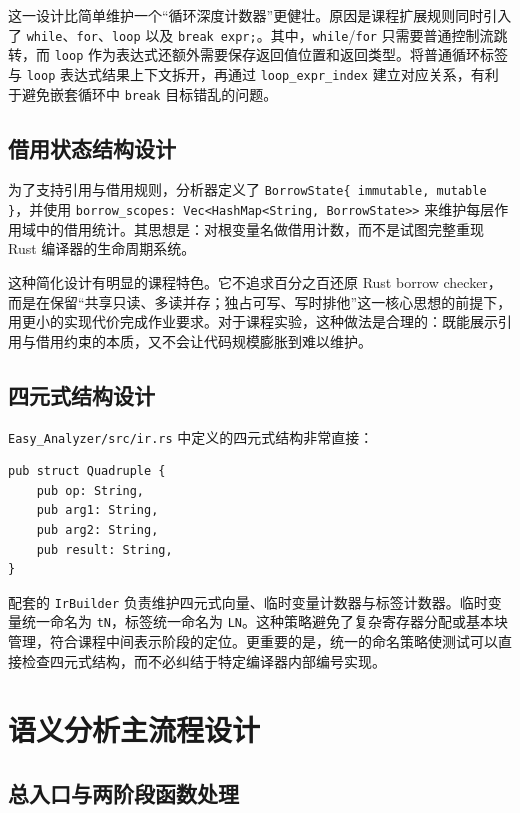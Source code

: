\documentclass[UTF8,a4paper,12pt]{ctexart}
\newcommand{\pkg}[1]{\texttt{#1}}
\begin{document}
这一设计比简单维护一个“循环深度计数器”更健壮。原因是课程扩展规则同时引入了 \pkg{while}、\pkg{for}、\pkg{loop} 以及 \pkg{break expr;}。其中，\pkg{while}/\pkg{for} 只需要普通控制流跳转，而 \pkg{loop} 作为表达式还额外需要保存返回值位置和返回类型。将普通循环标签与 \pkg{loop} 表达式结果上下文拆开，再通过 \pkg{loop\_expr\_index} 建立对应关系，有利于避免嵌套循环中 \pkg{break} 目标错乱的问题。

\subsection{借用状态结构设计}

为了支持引用与借用规则，分析器定义了 \pkg{BorrowState\{ immutable, mutable \}}，并使用 \pkg{borrow\_scopes: Vec<HashMap<String, BorrowState>>} 来维护每层作用域中的借用统计。其思想是：对根变量名做借用计数，而不是试图完整重现 Rust 编译器的生命周期系统。

这种简化设计有明显的课程特色。它不追求百分之百还原 Rust borrow checker，而是在保留“共享只读、多读并存；独占可写、写时排他”这一核心思想的前提下，用更小的实现代价完成作业要求。对于课程实验，这种做法是合理的：既能展示引用与借用约束的本质，又不会让代码规模膨胀到难以维护。

\subsection{四元式结构设计}

\pkg{Easy\_Analyzer/src/ir.rs} 中定义的四元式结构非常直接：

\begin{lstlisting}[style=textStyle,caption={四元式结构}]
pub struct Quadruple {
    pub op: String,
    pub arg1: String,
    pub arg2: String,
    pub result: String,
}
\end{lstlisting}

配套的 \pkg{IrBuilder} 负责维护四元式向量、临时变量计数器与标签计数器。临时变量统一命名为 \pkg{tN}，标签统一命名为 \pkg{LN}。这种策略避免了复杂寄存器分配或基本块管理，符合课程中间表示阶段的定位。更重要的是，统一的命名策略使测试可以直接检查四元式结构，而不必纠结于特定编译器内部编号实现。

\section{语义分析主流程设计}

\subsection{总入口与两阶段函数处理}
\end{document}
